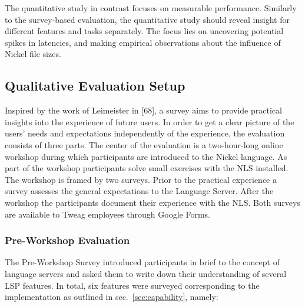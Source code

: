 \documentclass[
  a4paper,
  bibtex,
  english,
  nomenclature]{kthlatex/kththesis/kththesis}
\begin{document}
The quantitative study in contrast focuses on measurable performance.
Similarly to the survey-based evaluation, the quantitative study should
reveal insight for different features and tasks separately. The focus
lies on uncovering potential spikes in latencies, and making empirical
observations about the influence of Nickel file sizes.

\hypertarget{sec:qualitative-methods}{%
\subsection{Qualitative Evaluation
Setup}\label{sec:qualitative-methods}}

Inspired by the work of Leimeister in {[}68{]}, a survey aims to provide
practical insights into the experience of future users. In order to get
a clear picture of the users' needs and expectations independently of
the experience, the evaluation consists of three parts. The center of
the evaluation is a two-hour-long online workshop during which
participants are introduced to the Nickel language. As part of the
workshop participants solve small exercises with the NLS installed. The
workshop is framed by two surveys. Prior to the practical experience a
survey assesses the general expectations to the Language Server. After
the workshop the participants document their experience with the NLS.
Both surveys are available to Tweag employees through Google Forms.

\hypertarget{sec:pre-workshop-evaluation}{%
\subsubsection{Pre-Workshop
Evaluation}\label{sec:pre-workshop-evaluation}}

The Pre-Workshop Survey introduced participants in brief to the concept
of language servers and asked them to write down their understanding of
several LSP features. In total, six features were surveyed corresponding
to the implementation as outlined in sec.~\ref{sec:capability}, namely:
\end{document}
